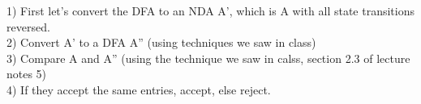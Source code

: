 
1) First let's convert the DFA to an NDA A', which is A with all state transitions reversed. \\

2) Convert A' to a DFA A'' (using techniques we saw in class) \\

3) Compare A and A'' (using the technique we saw in calss, section 2.3 of lecture notes 5) \\

4) If they accept the same entries, accept, else reject.